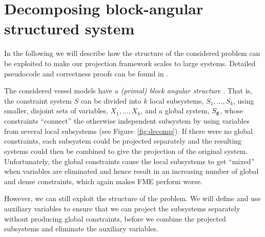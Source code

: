 %
%
\section{Decomposing block-angular structured system}
\label{sec:decomp}
In the following we will describe how the structure of the considered problem can be exploited to make our projection framework scales to large systems. Detailed pseudocode and correctness proofs can be found in \cite{MyTechRep}. 

The considered vessel models have a \emph{(primal) block angular structure} \cite{williams}. That is, the constraint system $S$ can be divided into $k$ local subsystems, $S_1, \ldots, S_k$, using smaller, disjoint sets of variables, $X_1, \ldots, X_k$, and a global system, $S_{\texttt{g}}$, whose constraints ``connect'' the otherwise independent subsystem by using variables from several local subsystems (see Figure~\ref{fig:decomp}). 
%
If there were no global constraints, each subsystem could be projected separately and the resulting systems could then be combined to give the projection of the original system. 
Unfortunately, the global constraints cause the local subsystems to get ``mixed'' when variables are eliminated and hence result in an increasing number of global and dense constraints, which again makes FME perform worse.

However, we can still exploit the structure of the problem. We will define and use auxiliary variables to ensure that we can project the subsystems separately without producing global constraints, before we combine the projected  subsystems and eliminate the auxiliary variables.
 
